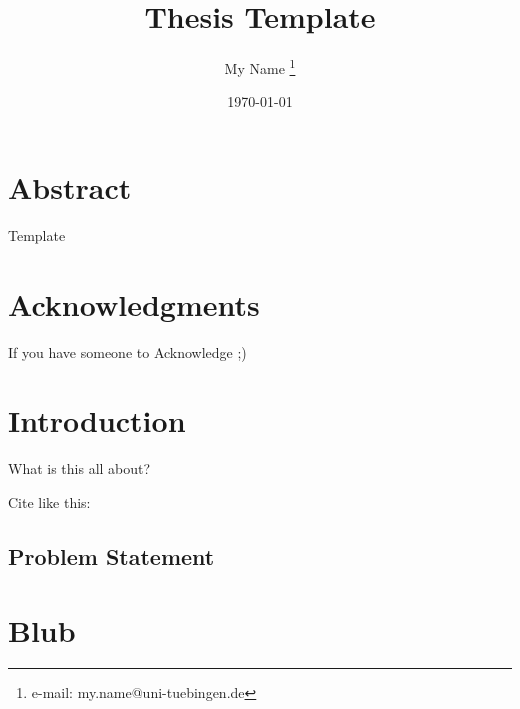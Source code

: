 \documentclass[a4paper,cleardoubleempty,BCOR1cm]{scrbook}
\title{Thesis Template}
\author{My Name \thanks{e-mail: my.name@uni-tuebingen.de}}
\date{\today}
\begin{document}


\chapter*{Abstract}
Template

\chapter*{Acknowledgments}
If you have someone to Acknowledge ;)

\tableofcontents


\chapter{Introduction}
What is this all about?

Cite like this: \cite{agarwal2011}

\section{Problem Statement}



\appendix
\chapter{Blub}



\end{document}
